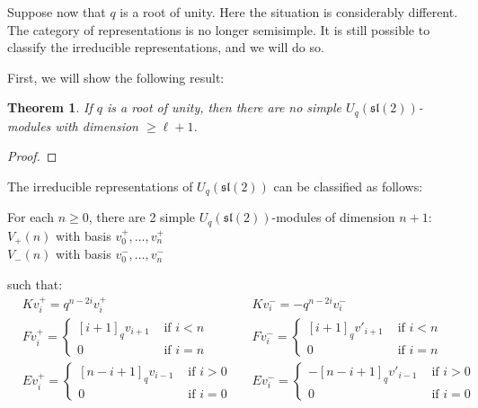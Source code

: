 \documentclass[]{article}
\newtheorem{theorem}{Theorem}[subsection]
\newcommand{\sll}{\mathfrak{sl}}
\numberwithin{equation}{subsection}
\begin{document}


Suppose now that $q$ is a root of unity. Here the situation is considerably
different. The category of representations is no longer semisimple. It is
still possible to classify the irreducible representations, and we will do so. 

First, we will show the following result:

\begin{theorem}
If $q$ is a root of unity, then there are no simple $U_q(\sll(2))$-modules
with dimension $\geq \ell+1$. 
\end{theorem}

\begin{proof}
\end{proof}

The irreducible representations of
$U_q(\sll(2))$ can be classified as follows: 

For each $n\geq 0$, there are 2 simple $U_q(\sll(2))$-modules of dimension $n+1$: 
$V_+(n)$ with basis $v^+_0, \ldots, v^+_n$ \\
$V_-(n)$ with basis $v^-_0, \ldots, v^-_n$

such that: 
\begin{align*}
    &K v^+_i = q^{n-2i} v^+_i  &
    &K v^-_i = -q^{n-2i} v^-_i \\
    &F v^+_i = \begin{cases} [i+1]_qv_{i+1}& \text{ if $i < n$} \\ 0& \text{ if $i = n$} \end{cases} &
    &F v^-_i = \begin{cases} [i+1]_qv'_{i+1}& \text{ if $i < n$} \\ 0& \text{ if $i = n$} \end{cases} \\
    &E v^+_i = \begin{cases} 
                     [n-i+1]_qv_{i-1}& \text{ if $i > 0$} \\ 
                    0& \text{ if $i = 0$} 
             \end{cases} &
    &E v^-_i = \begin{cases} 
                    -[n-i+1]_q v'_{i-1}& \text{ if $i > 0$} \\ 
                    0& \text{ if $i = 0$} 
             \end{cases}
\end{align*}
\end{document}
